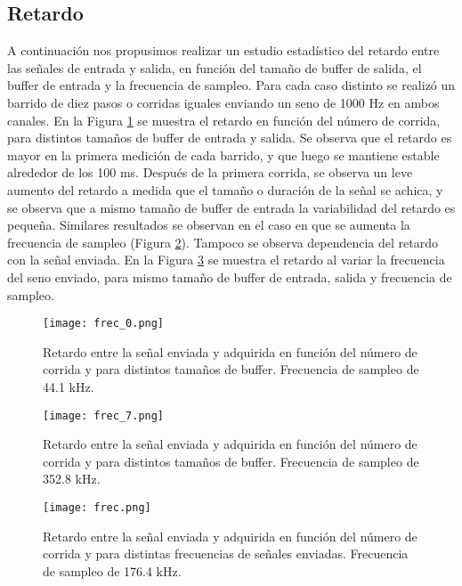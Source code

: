 \documentclass[a4paper, 11pt]{article}
\begin{document}
\subsection*{Retardo}
A continuación nos propusimos realizar un estudio estadístico del retardo entre las señales de entrada y salida, en función del tamaño de buffer de salida, el buffer de entrada y la frecuencia de sampleo. Para cada caso distinto se realizó un barrido de diez pasos o corridas iguales enviando un seno de 1000 Hz en ambos canales. En la Figura \ref{fig:frec_0} se muestra el retardo en función del número de corrida, para distintos tamaños de buffer de entrada y salida. Se observa que el retardo es mayor en la primera medición de cada barrido, y que luego se mantiene estable alrededor de los 100 ms. Después de la primera corrida, se observa un leve aumento del retardo a medida que el tamaño o duración de la señal se achica, y se observa que a mismo tamaño de buffer de entrada la variabilidad del retardo es pequeña. Similares resultados se observan en el caso en que se aumenta la frecuencia de sampleo (Figura \ref{fig:frec_7}). 
Tampoco se observa dependencia del retardo con la señal enviada. En la Figura \ref{fig:frec} se muestra el retardo al variar la frecuencia del seno enviado, para mismo tamaño de buffer de entrada, salida y frecuencia de sampleo.
 
\begin{figure} [H]
\centering
\texttt{[image: frec\_0.png]}
\caption{Retardo entre la señal enviada y adquirida en función del número de corrida y para distintos tamaños de buffer. Frecuencia de sampleo de 44.1 kHz. \label{fig:frec_0}}
\end{figure} 
 
\begin{figure} [H]
\centering
\texttt{[image: frec\_7.png]}
\caption{Retardo entre la señal enviada y adquirida en función del número de corrida y para distintos tamaños de buffer. Frecuencia de sampleo de 352.8 kHz.  \label{fig:frec_7}}
\end{figure} 




\begin{figure} [H]
\centering
\texttt{[image: frec.png]}
\caption{Retardo entre la señal enviada y adquirida en función del número de corrida y para distintas frecuencias de señales enviadas. Frecuencia de sampleo de 176.4 kHz.  \label{fig:frec}}
\end{figure} 







%
\end{document}
